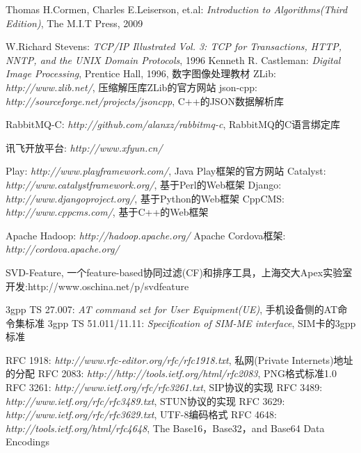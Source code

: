 \documentclass[a4paper]{book}
\begin{document}
\begin{thebibliography}{99}
Thomas H.Cormen, Charles E.Leiserson, et.al: {\em Introduction to Algorithms(Third Edition)}, The M.I.T Press, 2009

W.Richard Stevens: {\em TCP/IP Illustrated Vol. 3: TCP for Transactions, HTTP, NNTP, and the UNIX Domain Protocols}, 1996
 Kenneth R. Castleman: {\em Digital Image Processing}, Prentice Hall, 1996, 数字图像处理教材
 ZLib: {\em http://www.zlib.net/}, 压缩解压库ZLib的官方网站
 json-cpp: {\em http://sourceforge.net/projects/jsoncpp}, C++的JSON数据解析库

 RabbitMQ-C: {\em http://github.com/alanxz/rabbitmq-c}, RabbitMQ的C语言绑定库

 讯飞开放平台: {\em http://www.xfyun.cn/} 

 Play: {\em http://www.playframework.com/}, Java Play框架的官方网站
 Catalyst: {\em http://www.catalystframework.org/}, 基于Perl的Web框架
 Django: {\em http://www.djangoproject.org/}, 基于Python的Web框架
 CppCMS: {\em http://www.cppcms.com/}, 基于C++的Web框架

 Apache Hadoop: {\em http://hadoop.apache.org/}
 Apache Cordova框架: {\em http://cordova.apache.org/}

 SVD-Feature, 一个feature-based协同过滤(CF)和排序工具，上海交大Apex实验室开发:{http://www.oschina.net/p/svdfeature}


 3gpp TS 27.007: {\em AT command set for User Equipment(UE)}, 手机设备侧的AT命令集标准
 3gpp TS 51.011/11.11: {\em Specification of SIM-ME interface}, SIM卡的3gpp标准

 RFC 1918: {\em http://www.rfc-editor.org/rfc/rfc1918.txt}, 私网(Private Internets)地址的分配
 RFC 2083: {\em http://http://tools.ietf.org/html/rfc2083}, PNG格式标准1.0
 RFC 3261: {\em http://www.ietf.org/rfc/rfc3261.txt}, SIP协议的实现
 RFC 3489: {\em http://www.ietf.org/rfc/rfc3489.txt}, STUN协议的实现
 RFC 3629: {\em http://www.ietf.org/rfc/rfc3629.txt}, UTF-8编码格式
 RFC 4648: {\em http://tools.ietf.org/html/rfc4648}, The Base16，Base32，and Base64 Data Encodings
\end{thebibliography}


\cleardoublepage
{}

\printglossaries

\printindex



\end{document}

